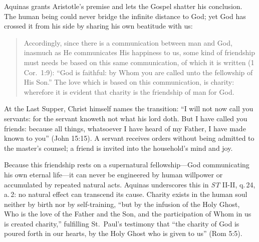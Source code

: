 Aquinas grants Aristotle's premise and lets the Gospel shatter his conclusion. The human being could never bridge the infinite distance to God; yet God has crossed it from his side by sharing his own beatitude with us:

\begin{quote}
Accordingly, since there is a communication between man and God, inasmuch as He communicates His happiness to us, some kind of friendship must needs be based on this same communication, of which it is written (1 Cor.\ 1:9): ``God is faithful: by Whom you are called unto the fellowship of His Son.'' The love which is based on this communication, is charity: wherefore it is evident that charity is the friendship of man for God.
\end{quote}

At the Last Supper, Christ himself names the transition: ``I will not now call you servants: for the servant knoweth not what his lord doth. But I have called you friends: because all things, whatsoever I have heard of my Father, I have made known to you'' (John 15:15). A servant receives orders without being admitted to the master's counsel; a friend is invited into the household's mind and joy.

Because this friendship rests on a supernatural fellowship---God communicating his own eternal life---it can never be engineered by human willpower or accumulated by repeated natural acts. Aquinas underscores this in \emph{ST} II-II, q.\,24, a.\,2: no natural effect can transcend its cause. Charity exists in the human soul neither by birth nor by self-training, ``but by the infusion of the Holy Ghost, Who is the love of the Father and the Son, and the participation of Whom in us is created charity,'' fulfilling St.\ Paul's testimony that ``the charity of God is poured forth in our hearts, by the Holy Ghost who is given to us'' (Rom 5:5).

